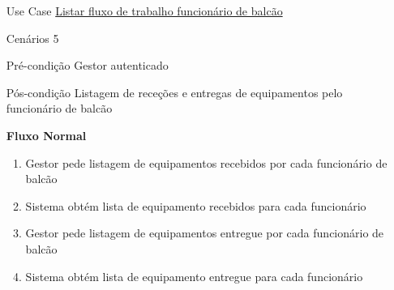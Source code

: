 \documentclass[../relatorio.tex]{subfiles}
\begin{document}
\begin{itemize}
    \item[Use Case] {\underline{Listar fluxo de trabalho funcionário de balcão}}
    \item[Cenários] {5}
    \item[Pré-condição] {Gestor autenticado}
    \item[Pós-condição] {Listagem de receções e entregas de equipamentos pelo funcionário de balcão}
          \begin{flushleft}
              \textbf{Fluxo Normal}
          \end{flushleft}
          \begin{enumerate}
              \item Gestor pede listagem de equipamentos recebidos por cada funcionário de balcão
              \item Sistema obtém lista de equipamento recebidos para cada funcionário
              \item Gestor pede listagem de equipamentos entregue por cada funcionário de balcão
              \item Sistema obtém lista de equipamento entregue para cada funcionário
          \end{enumerate}
\end{itemize}
\end{document}
